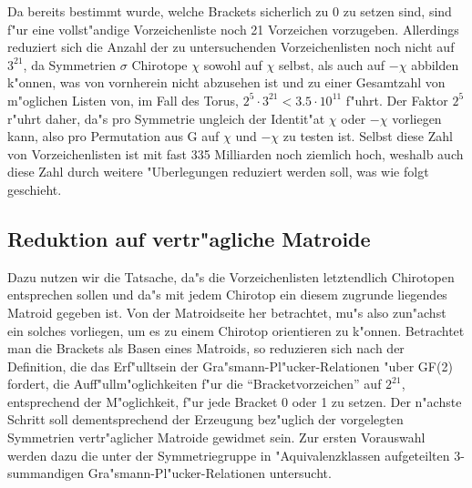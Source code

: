 Da bereits bestimmt wurde, welche Brackets sicherlich zu 0 zu setzen sind,
sind f"ur eine vollst"andige Vorzeichenliste noch 21 Vorzeichen vorzugeben.
Allerdings reduziert sich die Anzahl der zu untersuchenden Vorzeichenlisten
noch nicht auf $3^{21}$, da Symmetrien $\sigma$ Chirotope $\chi$ sowohl auf
$\chi$ selbst, als auch auf $-\chi$ abbilden k"onnen, was von vornherein
nicht abzusehen ist und zu einer Gesamtzahl von m"oglichen Listen von, im Fall
des Torus, $2^5\cdot 3^{21}< 3.5\cdot 10^{11}$ f"uhrt. Der Faktor $2^5$ r"uhrt
daher, da"s pro Symmetrie ungleich der Identit"at $\chi$ oder $-\chi$ vorliegen
kann, also pro Permutation aus G auf $\chi$ und $-\chi$ zu testen ist.
\label{symmtest} Selbst diese Zahl von Vorzeichenlisten ist mit fast 335
Milliarden noch ziemlich hoch, weshalb auch diese Zahl durch weitere
"Uberlegungen reduziert werden soll, was wie folgt geschieht.

\subsection{Reduktion auf vertr"agliche Matroide}

Dazu nutzen wir die Tatsache, da"s die Vorzeichenlisten letztendlich Chirotopen
entsprechen sollen und da"s mit jedem Chirotop ein diesem zugrunde liegendes
Matroid gegeben ist. Von der Matroidseite her betrachtet, mu"s also zun"achst
ein solches vorliegen, um es zu einem Chirotop orientieren zu k"onnen.
Betrachtet man die Brackets als Basen eines Matroids, so reduzieren sich nach
der Definition, die das Erf"ulltsein der Gra"smann-Pl"ucker-Relationen "uber
GF(2) fordert, die Auff"ullm"oglichkeiten f"ur die "`Bracketvorzeichen"' auf
$2^{21}$, entsprechend der M"oglichkeit, f"ur jede Bracket 0 oder 1 zu setzen.
Der n"achste Schritt soll dementsprechend der Erzeugung bez"uglich der
vorgelegten Symmetrien vertr"aglicher Matroide gewidmet sein. Zur ersten
Vorauswahl werden dazu die unter der Symmetriegruppe in "Aquivalenzklassen
aufgeteilten 3-summandigen Gra"smann-Pl"ucker-Relationen untersucht.

